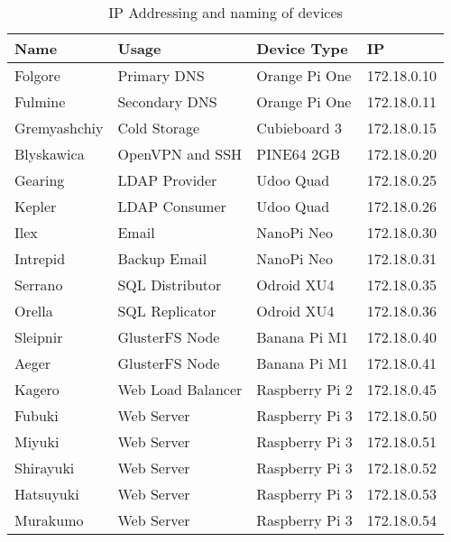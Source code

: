 \documentclass[12pt]{spieman}  %
\begin{document}
\begin{table}[ht]
\caption{IP Addressing and naming of devices}
\label{tab:ip-addresses}
\begin{center}
\begin{tabular}{|l|l|l|l|}
\hline
\rule[-1ex]{0pt}{3.5ex} Name         & Usage             & Device Type    & IP          \\
\hline\hline
\rule[-1ex]{0pt}{3.5ex} Folgore      & Primary DNS       & Orange Pi One  & 172.18.0.10 \\
\hline
\rule[-1ex]{0pt}{3.5ex} Fulmine      & Secondary DNS     & Orange Pi One  & 172.18.0.11 \\
\hline
\rule[-1ex]{0pt}{3.5ex} Gremyashchiy & Cold Storage      & Cubieboard 3   & 172.18.0.15 \\
\hline
\rule[-1ex]{0pt}{3.5ex} Blyskawica   & OpenVPN and SSH   & PINE64 2GB     & 172.18.0.20 \\
\hline
\rule[-1ex]{0pt}{3.5ex} Gearing      & LDAP Provider     & Udoo Quad      & 172.18.0.25 \\
\hline
\rule[-1ex]{0pt}{3.5ex} Kepler       & LDAP Consumer     & Udoo Quad      & 172.18.0.26 \\
\hline
\rule[-1ex]{0pt}{3.5ex} Ilex         & Email             & NanoPi Neo     & 172.18.0.30 \\
\hline
\rule[-1ex]{0pt}{3.5ex} Intrepid     & Backup Email      & NanoPi Neo     & 172.18.0.31 \\
\hline
\rule[-1ex]{0pt}{3.5ex} Serrano      & SQL Distributor   & Odroid XU4     & 172.18.0.35 \\
\hline
\rule[-1ex]{0pt}{3.5ex} Orella       & SQL Replicator    & Odroid XU4     & 172.18.0.36 \\
\hline
\rule[-1ex]{0pt}{3.5ex} Sleipnir     & GlusterFS Node    & Banana Pi M1   & 172.18.0.40 \\
\hline
\rule[-1ex]{0pt}{3.5ex} Aeger        & GlusterFS Node    & Banana Pi M1   & 172.18.0.41 \\
\hline
\rule[-1ex]{0pt}{3.5ex} Kagero       & Web Load Balancer & Raspberry Pi 2 & 172.18.0.45 \\
\hline
\rule[-1ex]{0pt}{3.5ex} Fubuki       & Web Server        & Raspberry Pi 3 & 172.18.0.50 \\
\hline
\rule[-1ex]{0pt}{3.5ex} Miyuki       & Web Server        & Raspberry Pi 3 & 172.18.0.51 \\
\hline
\rule[-1ex]{0pt}{3.5ex} Shirayuki    & Web Server        & Raspberry Pi 3 & 172.18.0.52 \\
\hline
\rule[-1ex]{0pt}{3.5ex} Hatsuyuki    & Web Server        & Raspberry Pi 3 & 172.18.0.53 \\
\hline
\rule[-1ex]{0pt}{3.5ex} Murakumo     & Web Server        & Raspberry Pi 3 & 172.18.0.54 \\
\hline
\end{tabular}
\end{center}
\end{table}
\end{document}
